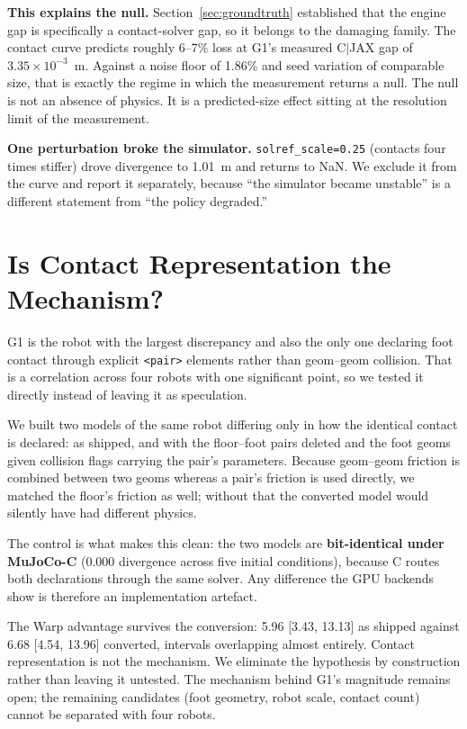 \documentclass[conference]{IEEEtran}
\begin{document}
\textbf{This explains the null.} Section~\ref{sec:groundtruth} established
that the engine gap is specifically a contact-solver gap, so it belongs to
the damaging family. The contact curve predicts roughly 6--7\% loss at
G1's measured C$|$JAX gap of $3.35\times10^{-3}$~m. Against a noise floor
of 1.86\% and seed variation of comparable size, that is exactly the
regime in which the measurement returns a null. The null is not an absence
of physics. It is a predicted-size effect sitting at the resolution limit
of the measurement.

\textbf{One perturbation broke the simulator.} \texttt{solref\_scale=0.25}
(contacts four times stiffer) drove divergence to 1.01~m and returns to
NaN. We exclude it from the curve and report it separately, because ``the
simulator became unstable'' is a different statement from ``the policy
degraded.''

\section{Is Contact Representation the Mechanism?}
\label{sec:contactrep}

G1 is the robot with the largest discrepancy and also the only one
declaring foot contact through explicit \verb|<pair>| elements rather than
geom--geom collision. That is a correlation across four robots with one
significant point, so we tested it directly instead of leaving it as
speculation.

We built two models of the same robot differing only in how the identical
contact is declared: as shipped, and with the floor--foot pairs deleted
and the foot geoms given collision flags carrying the pair's parameters.
Because geom--geom friction is combined between two geoms whereas a pair's
friction is used directly, we matched the floor's friction as well;
without that the converted model would silently have had different physics.

The control is what makes this clean: the two models are
\textbf{bit-identical under MuJoCo-C} (0.000 divergence across five
initial conditions), because C routes both declarations through the same
solver. Any difference the GPU backends show is therefore an
implementation artefact.

The Warp advantage survives the conversion: 5.96 [3.43, 13.13] as shipped
against 6.68 [4.54, 13.96] converted, intervals overlapping almost
entirely. Contact representation is not the mechanism. We eliminate the
hypothesis by construction rather than leaving it untested. The mechanism
behind G1's magnitude remains open; the remaining candidates (foot
geometry, robot scale, contact count) cannot be separated with four robots.
\end{document}
